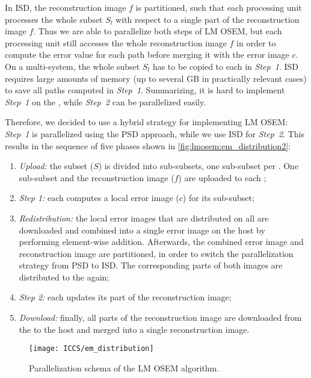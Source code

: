 In ISD, the reconstruction image $f$ is partitioned, such that each processing unit processes the whole subset $S_l$ with respect to a single part of the reconstruction image $f$.
Thus we are able to parallelize both steps of LM OSEM, but each processing unit still accesses the whole reconstruction image $f$ in order to compute the error value for each path before merging it with the error image $c$.
On a multi-\GPU system, the whole subset $S_l$ has to be copied to each \GPU in \emph{Step~1}.
ISD requires large amounts of memory (up to several GB in practically relevant cases) to save all paths computed in \emph{Step~1}.
Summarizing, it is hard to implement \emph{Step~1} on the \GPU, while \emph{Step~2} can be parallelized easily.

Therefore, we decided to use a hybrid strategy for implementing LM OSEM:
\emph{Step~1} is parallelized using the PSD approach, while we use ISD for \emph{Step~2}.
This results in the sequence of five phases shown in \autoref{fig:lmosem:em_distribution2}:
\begin{enumerate}
\item \emph{Upload:} the subset ($S$) is divided into sub-subsets, one sub-subset per \GPU.
      One sub-subset and the reconstruction image ($f$) are uploaded to each \GPU;
\item \emph{Step 1:} each \GPU computes a local error image ($c$) for its sub-subset;
\item \emph{Redistribution:} the local error images that are distributed on all \GPUs are downloaded and combined into a single error image on the host by performing element-wise addition.
      Afterwards, the combined error image and reconstruction image are partitioned, in order to switch the parallelization strategy from PSD to ISD.
      The corresponding parts of both images are distributed to the \GPUs again;
\item \emph{Step 2:} each \GPU updates its part of the reconstruction image;
\item \emph{Download:} finally, all parts of the reconstruction image are downloaded from the \GPUs to the host and merged into a single reconstruction image.
\end{enumerate}

\begin{figure}
  \centering
  \texttt{[image: ICCS/em\_distribution]}
  \caption{Parallelization schema of the LM OSEM algorithm.}
  \label{fig:lmosem:em_distribution2}
\end{figure}


